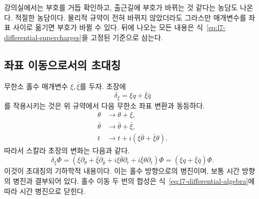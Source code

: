 \begin{classroomqa}
\end{classroomqa}

강의실에서는 부호를 거듭 확인하고, 출근길에 부호가 바뀌는 것 같다는 농담도 나온다. 적절한 농담이다. 물리적 규약이 전혀 바뀌지 않았더라도 그라스만 매개변수를 좌표 사이로 옮기면 부호가 바뀔 수 있다. 뒤에 나오는 모든 내용은 식~\eqref{eq:l7-differential-supercharges}을 고정된 기준으로 삼는다.

\subsection{좌표 이동으로서의 초대칭}

무한소 홀수 매개변수 \(\xi,\bar\xi\)를 두자. 초장에
\begin{equation}
\delta_\xi=\xi q+\bar\xi\bar q
\end{equation}
를 작용시키는 것은 위 규약에서 다음 무한소 좌표 변환과 동등하다.
\begin{align}
\theta&\longrightarrow\theta+\xi,\\
\bar\theta&\longrightarrow\bar\theta+\bar\xi,\\
t&\longrightarrow t+i\left(\xi\bar\theta+\bar\xi\theta\right).
\label{eq:l7-coordinate-shift}
\end{align}
따라서 스칼라 초장의 변화는 다음과 같다.
\begin{equation}
\delta_\xi\Phi
=\left(\xi\partial_\theta+\bar\xi\partial_{\bar\theta}
+i\xi\bar\theta\partial_t+i\bar\xi\theta\partial_t\right)\Phi
=\left(\xi q+\bar\xi\bar q\right)\Phi.
\end{equation}
이것이 초대칭의 기하학적 내용이다. 이는 홀수 방향으로의 병진이며, 보통 시간 방향의 병진과 결부되어 있다. 홀수 이동 두 번의 합성은 식~\eqref{eq:l7-differential-algebra}에 따라 시간 병진으로 닫힌다.

\begin{classroomqa}
\end{classroomqa}

